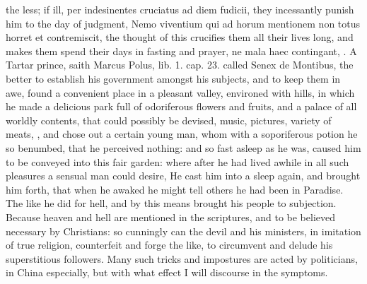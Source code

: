 {the less; if ill, per indesinentes cruciatus ad diem fudicii, they
incessantly punish him to the day of judgment, Nemo viventium qui ad
horum mentionem non totus horret et contremiscit, the thought of this
crucifies them all their lives long, and makes them spend their days in
fasting and prayer, ne mala haec contingant, \etc{}. A Tartar prince, saith
Marcus Polus, lib. 1. cap. 23. called Senex de Montibus, the better to
establish his government amongst his subjects, and to keep them in awe,
found a convenient place in a pleasant valley, environed with hills, in
which he made a delicious park full of odoriferous flowers and
fruits, and a palace of all worldly contents, that could possibly be
devised, music, pictures, variety of meats, \etc{}, and chose out a
certain young man, whom with a soporiferous potion he so
benumbed, that he perceived nothing: and so fast asleep as he was,
caused him to be conveyed into this fair garden: where after he had
lived awhile in all such pleasures a sensual man could desire, He
cast him into a sleep again, and brought him forth, that when he awaked
he might tell others he had been in Paradise. The like he did for hell,
and by this means brought his people to subjection. Because heaven and
hell are mentioned in the scriptures, and to be believed necessary by
Christians: so cunningly can the devil and his ministers, in imitation
of true religion, counterfeit and forge the like, to circumvent and
delude his superstitious followers. Many such tricks and impostures are
acted by politicians, in China especially, but with what effect I will
discourse in the symptoms.

}
